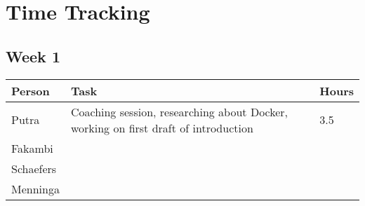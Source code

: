 \chapter{Time Tracking}
\label{App: Time Tracking}

\section*{Week 1}
\begin{longtable}{p{} p{} p{}}
	\textbf{Person} & \textbf{Task} & \textbf{Hours} \\ \toprule
	Putra           & Coaching session, researching about Docker, working on first draft of introduction 	& 3.5	\\ \midrule
	Fakambi         &	&	\\ \midrule
	Schaefers       & 	& 	\\ \midrule
	Menninga        &	&	\\ \bottomrule
\end{longtable}